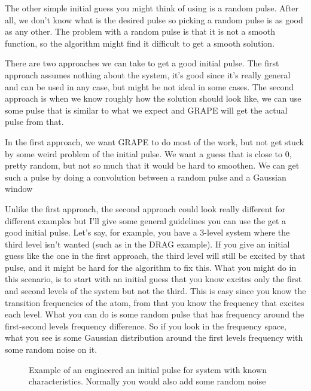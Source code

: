 The other simple initial guess you might think of using is a random pulse. After all, we don't know what is the desired pulse so picking a random pulse is as good as any other. The problem with a random pulse is that it is not a smooth function, so the algorithm might find it difficult to get a smooth solution.

There are two approaches we can take to get a good initial pulse. The first approach assumes nothing about the system, it's good since it's really general and can be used in any case, but might be not ideal in some cases. The second approach is when we know roughly how the solution should look like, we can use some pulse that is similar to what we expect and GRAPE will get the actual pulse from that.

In the first approach, we want GRAPE to do most of the work, but not get stuck by some weird problem of the initial pulse. We want a guess that is close to 0, pretty random, but not so much that it would be hard to smoothen. We can get such a pulse by doing a convolution between a random pulse and a Gaussian window 

Unlike the first approach, the second approach could look really different for different examples but I'll give some general guidelines you can use the get a good initial pulse. Let's say, for example, you have a 3-level system where the third level isn't wanted (such as in the DRAG example). If you give an initial guess like the one in the first approach, the third level will still be excited by that pulse, and it might be hard for the algorithm to fix this. What you might do in this scenario, is to start with an initial guess that you know excites only the first and second levels of the system but not the third. This is easy since you  know the transition frequencies of the atom, from that you know the frequency that excites each level. What you can do is some random pulse that has frequency around the first-second levels frequency difference. So if you look in the frequency space, what you see is some Gaussian distribution around the first levels frequency with some random noise on it.

\begin{figure}[H]
    \begin{center}
        
    \end{center}
    \caption{Example of an engineered an initial pulse for system with known characteristics. Normally you would also add some random noise}
    \label{fig:example-engineered-initial-guess}
\end{figure}

